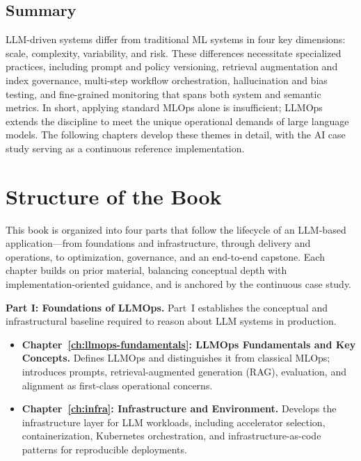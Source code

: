 \subsection{Summary}\label{sec:why-llmops-summary}
LLM-driven systems differ from traditional ML systems in four key dimensions: scale, complexity, variability, and risk. These differences necessitate specialized practices, including prompt and policy versioning, retrieval augmentation and index governance, multi-step workflow orchestration, hallucination and bias testing, and fine-grained monitoring that spans both system and semantic metrics. In short, applying standard MLOps alone is insufficient; LLMOps extends the discipline to meet the unique operational demands of large language models. The following chapters develop these themes in detail, with the \ishtar{} AI case study serving as a continuous reference implementation.

\section{Structure of the Book}
\label{sec:book-structure}

This book is organized into four parts that follow the lifecycle of an LLM-based application---from foundations and infrastructure, through delivery and operations, to optimization, governance, and an end-to-end capstone. Each chapter builds on prior material, balancing conceptual depth with implementation-oriented guidance, and is anchored by the continuous \ishtar{} case study.

\medskip
\noindent\textbf{Part I: Foundations of LLMOps.}
Part~I establishes the conceptual and infrastructural baseline required to reason about LLM systems in production.
\begin{itemize}
  \item \textbf{Chapter~\ref{ch:llmops-fundamentals}: LLMOps Fundamentals and Key Concepts.}
  Defines LLMOps and distinguishes it from classical MLOps; introduces prompts, retrieval-augmented generation (RAG), evaluation, and alignment as first-class operational concerns.
  \item \textbf{Chapter~\ref{ch:infra}: Infrastructure and Environment.}
  Develops the infrastructure layer for LLM workloads, including accelerator selection, containerization, Kubernetes orchestration, and infrastructure-as-code patterns for reproducible deployments.
\end{itemize}

